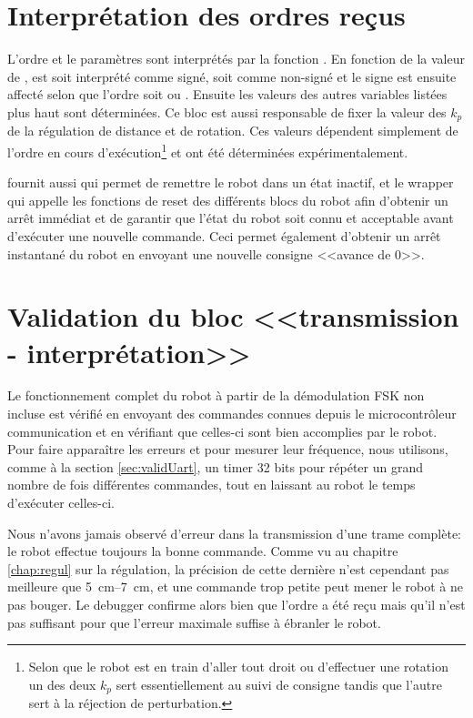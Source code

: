 \section{Interprétation des ordres reçus}
L'ordre et le paramètres sont interprétés par la fonction . En fonction de la valeur de ,  est soit interprété comme signé, soit comme non-signé et le signe est ensuite affecté selon que l'ordre soit  ou . Ensuite les valeurs des autres variables listées plus haut sont déterminées. Ce bloc est aussi responsable de fixer la valeur des $k_p$ de la régulation de distance et de rotation. Ces valeurs dépendent simplement de l'ordre en cours d'exécution\footnote{Selon que le robot est en train d'aller tout droit ou d'effectuer une rotation un des deux $k_p$ sert essentiellement au suivi de consigne tandis que l'autre sert à la réjection de perturbation.} et ont été déterminées expérimentalement.

 fournit aussi  qui permet de remettre le robot dans un état inactif, et le wrapper  qui appelle les fonctions de reset des différents blocs du robot afin d'obtenir un arrêt immédiat et de garantir que l'état du robot soit connu et acceptable avant d'exécuter une nouvelle commande. Ceci permet également d'obtenir un arrêt instantané du robot en envoyant une nouvelle consigne <<avance de 0>>.

\section{Validation du bloc <<transmission - interprétation>>}

Le fonctionnement complet du robot à partir de la démodulation FSK non incluse est vérifié en envoyant des commandes connues depuis le microcontrôleur communication et en vérifiant que celles-ci sont bien accomplies par le robot. Pour faire apparaître les erreurs et pour mesurer leur fréquence, nous utilisons, comme à la section \ref{sec:validUart}, un timer 32 bits pour répéter un grand nombre de fois différentes commandes, tout en laissant au robot le temps d'exécuter celles-ci.

Nous n'avons jamais observé d'erreur dans la transmission d'une trame complète: le robot effectue toujours la bonne commande. Comme vu au chapitre \ref{chap:regul} sur la régulation, la précision de cette dernière n'est cependant pas meilleure que \SIrange{5}{7}{\centi\meter}, et une commande trop petite peut mener le robot à ne pas bouger. Le debugger confirme alors bien que l'ordre a été reçu mais qu'il n'est pas suffisant pour que l'erreur maximale suffise à ébranler le robot.
